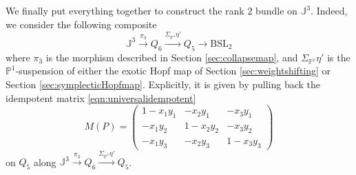 \documentclass[11pt,leqno]{article}
\newcommand{\pone}{{\mathbb P}^1}
\renewcommand{\1}{{\rm 1\hspace*{-0.4ex}%
\rule{0.1ex}{1.52ex}\hspace*{0.2ex}}}
\newcommand{\<}[1]{{\langle}#1 {\rangle}}
\theoremstyle{plain}
\theoremstyle{definition}
\theoremstyle{remark}
\numberwithin{equation}{section}
\begin{document}
We finally put everything together to construct the rank $2$ bundle on $\mathbb{J}^3$. Indeed, we consider the following composite
\[
\mathbb{J}^3\xrightarrow{\pi_3} Q_6\xrightarrow{\Sigma_{\pone}\eta'}Q_5\to \mathrm{BSL}_2
\]
where $\pi_3$ is the morphism described in Section \ref{sec:collapsemap}, and $\Sigma_{\pone}\eta'$ is the $\pone$-suspension of either the exotic Hopf map of Section \ref{sec:weightshifting} or Section \ref{sec:symplecticHopfmap}. Explicitly, it is given by pulling back the idempotent matrix \eqref{eqn:universalidempotent} 
\[
M(P)=\begin{pmatrix} 1-x_1y_1 & -x_2y_1 & -x_3y_1 \\ -x_1y_2 & 1-x_2y_2 & -x_3y_2 \\ -x_1y_3 & -x_2y_3 & 1-x_3y_3\end{pmatrix}
\]
on $Q_5$ along $\mathbb{J}^3\xrightarrow{\pi_3} Q_6\xrightarrow{\Sigma_{\pone}\eta'}Q_5$.
\end{document}
